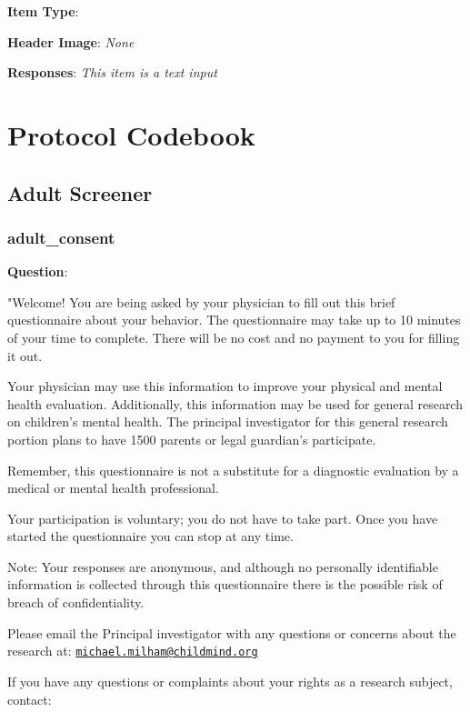 \documentclass[]{book}
\begin{document}
\textbf{Item Type}:

\textbf{Header Image}: \emph{None}

\textbf{Responses}: \emph{This item is a text input}

\hypertarget{part-protocol-codebook-2}{%
\part{Protocol Codebook}\label{part-protocol-codebook-2}}

\hypertarget{adult-screener}{%
\chapter{Adult Screener}\label{adult-screener}}

\hypertarget{adult_consent}{%
\section{adult\_consent}\label{adult_consent}}

\textbf{Question}:

"Welcome! You are being asked by your physician to fill out this brief questionnaire about your behavior. The questionnaire may take up to 10 minutes of your time to complete. There will be no cost and no payment to you for filling it out.

Your physician may use this information to improve your physical and mental health evaluation. Additionally, this information may be used for general research on children's mental health. The principal investigator for this general research portion plans to have 1500 parents or legal guardian's participate.

Remember, this questionnaire is not a substitute for a diagnostic evaluation by a medical or mental health professional.

Your participation is voluntary; you do not have to take part. Once you have started the questionnaire you can stop at any time.

Note: Your responses are anonymous, and although no personally identifiable information is collected through this questionnaire there is the possible risk of breach of confidentiality.

Please email the Principal investigator with any questions or concerns about the research at: \href{mailto:michael.milham@childmind.org}{\nolinkurl{michael.milham@childmind.org}}

If you have any questions or complaints about your rights as a research subject, contact:
\end{document}
